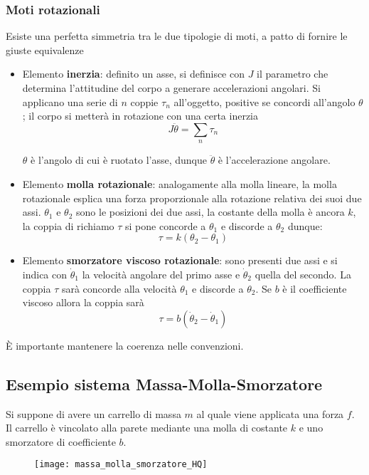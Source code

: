 \subsubsection{Moti rotazionali}
Esiste una perfetta simmetria tra le due tipologie di moti, a patto di fornire
le giuste equivalenze
\begin{itemize}
 \item Elemento \textbf{inerzia}: definito un asse, si definisce con $J$ il
parametro che determina l'attitudine del corpo a generare accelerazioni
angolari. Si applicano una serie di $n$ coppie $\tau_n$ all'oggetto, positive
se concordi all'angolo $\theta$; il corpo si metterà in rotazione con una
certa inerzia
$$
J\ddot{\theta} = \sum_n \tau_n
$$

$\theta$ è l'angolo di cui è ruotato l'asse, dunque $\ddot{\theta}$ è
l'accelerazione angolare.

 \item Elemento \textbf{molla rotazionale}: analogamente alla molla lineare, la
molla rotazionale esplica una forza proporzionale alla rotazione relativa dei
suoi due assi. $\theta_1$ e $\theta_2$ sono le posizioni dei due assi, la
costante della molla è ancora $k$, la coppia di richiamo $\tau$ si pone
concorde a $\theta_1$ e discorde a $\theta_2$ dunque:
$$
\tau = k\left(\theta_2 - \theta_1\right)
$$

 \item Elemento \textbf{smorzatore viscoso rotazionale}: sono presenti due assi
e si indica con $\dot{\theta}_1$ la velocità angolare del primo asse e
$\dot{\theta}_2$ quella del secondo. La coppia $\tau$ sarà concorde alla
velocità $\theta_1$ e discorde a $\theta_2$. Se $b$ è il coefficiente viscoso
allora la coppia sarà
$$
\tau = b(\dot{\theta}_2 - \dot{\theta}_1)
$$
\end{itemize}

È importante mantenere la coerenza nelle convenzioni.

\newpage
\subsection{Esempio sistema Massa-Molla-Smorzatore}
Si suppone di avere un carrello di massa $m$ al quale viene applicata una forza
$f$. Il carrello è vincolato alla parete mediante una molla di costante $k$ e
uno smorzatore di coefficiente $b$.
\begin{figure}[h]
 \centering
 \texttt{[image: massa\_molla\_smorzatore\_HQ]}
 \label{fig:massa_molla_smorzatore_HQ}
\end{figure}

